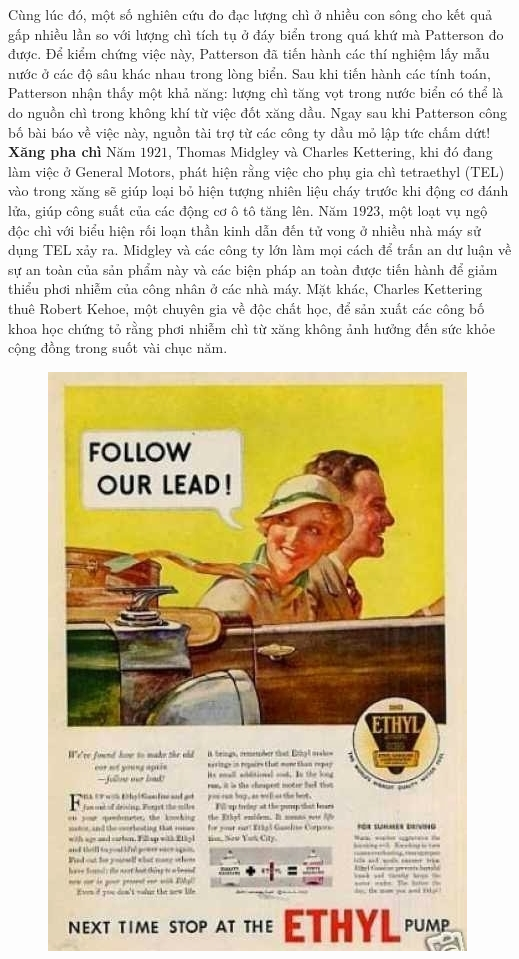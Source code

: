 \begin{multicols}{2}
	\vskip 0.1cm
	Cùng lúc đó, một số nghiên cứu đo đạc lượng chì ở nhiều con sông cho kết quả gấp nhiều lần so với lượng chì tích tụ ở đáy biển trong quá khứ mà Patterson đo được. Để kiểm chứng việc này, Patterson đã tiến hành các thí nghiệm lấy mẫu nước ở các độ sâu khác nhau trong lòng biển. Sau khi tiến hành các tính toán, Patterson nhận thấy một khả năng: lượng chì tăng vọt trong nước biển có thể là do nguồn chì trong không khí từ việc đốt xăng dầu. Ngay sau khi Patterson công bố bài báo về việc này, nguồn tài trợ từ các công ty dầu mỏ lập tức chấm dứt!
	\vskip 0.1cm
	\textbf{\color{timhieukhoahoc}Xăng pha chì}
	\vskip 0.1cm
	Năm $1921$, Thomas Midgley và Charles Kettering, khi đó đang làm việc ở General Motors, phát hiện rằng việc cho phụ gia chì tetraethyl (TEL) vào trong xăng sẽ giúp loại bỏ hiện tượng nhiên liệu cháy trước khi động cơ đánh lửa, giúp công suất của các động cơ ô tô tăng lên. Năm $1923$, một loạt vụ ngộ độc chì với biểu hiện rối loạn thần kinh dẫn đến tử vong ở nhiều nhà máy sử dụng TEL xảy ra. Midgley và các công ty lớn làm mọi cách để trấn an dư luận về sự an toàn của sản phẩm này và các biện pháp an toàn được tiến hành để giảm thiểu phơi nhiễm của công nhân ở các nhà máy. Mặt khác, Charles Kettering thuê Robert Kehoe, một chuyên gia về độc chất học, để sản xuất các công bố khoa học chứng tỏ rằng phơi nhiễm chì từ xăng không ảnh hưởng đến sức khỏe cộng đồng trong suốt vài chục năm.
	\begin{figure}[H]
		\vspace*{-5pt}
		\centering
		\captionsetup{labelformat= empty, justification=centering}
		\includegraphics[width= 1\linewidth]{4}

\end{figure}
\end{multicols}
